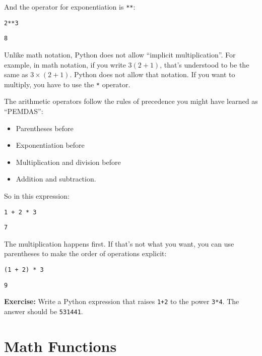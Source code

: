 And the operator for exponentiation is \passthrough{\lstinline!**!}:

\begin{lstlisting}[]
2**3
\end{lstlisting}

\begin{lstlisting}[style=output]
8
\end{lstlisting}

Unlike math notation, Python does not allow ``implicit multiplication''.
For example, in math notation, if you write \(3 (2 + 1)\), that's
understood to be the same as \(3 \times (2+ 1)\). Python does not allow
that notation. If you want to multiply, you have to use the
\passthrough{\lstinline!*!} operator.

The arithmetic operators follow the rules of precedence you might have
learned as ``PEMDAS'':

\begin{itemize}

\item
  Parentheses before
\item
  Exponentiation before
\item
  Multiplication and division before
\item
  Addition and subtraction.
\end{itemize}

So in this expression:

\begin{lstlisting}[]
1 + 2 * 3
\end{lstlisting}

\begin{lstlisting}[style=output]
7
\end{lstlisting}

The multiplication happens first. If that's not what you want, you can
use parentheses to make the order of operations explicit:

\begin{lstlisting}[]
(1 + 2) * 3
\end{lstlisting}

\begin{lstlisting}[style=output]
9
\end{lstlisting}

\textbf{Exercise:} Write a Python expression that raises
\passthrough{\lstinline!1+2!} to the power
\passthrough{\lstinline!3*4!}. The answer should be
\passthrough{\lstinline!531441!}.

\hypertarget{math-functions}{%
\section{Math Functions}\label{math-functions}}

